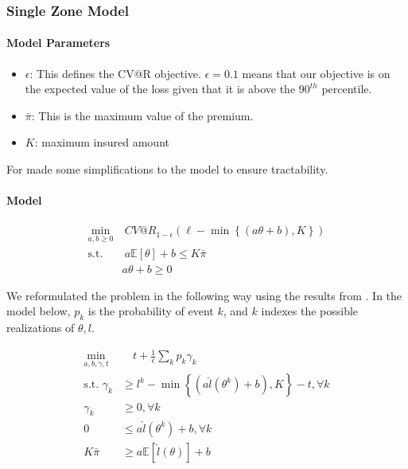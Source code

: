 \documentclass[11pt]{article}
\begin{document}
  \subsubsection*{Single Zone Model}
  \paragraph*{Model Parameters}
  \begin{itemize}
      \item $\epsilon$: This defines the CV@R objective. $\epsilon = 0.1$ means that our objective is on the expected value of the loss given that it is above the $90^{th}$ percentile. 
      \item $\bar{\pi}$: This is the maximum value of the premium. 
      \item $K$: maximum insured amount
  \end{itemize}

  For made some simplifications to the model to ensure tractability.
  
  \paragraph*{Model}
  \begin{align}
      \min_{a,b\geq 0} &\ CV@R_{1-\epsilon}\left(\ell  - \min\left\{(a\theta + b), K\right\} \right)\\
      \text{s.t.   } &\   a \mathbb{E} \left[\theta \right] + b \leq K\bar{\pi}\\
        & a\theta + b \geq 0 
  \end{align}
  
  We reformulated the problem in the following way using the results from \cite{rockafellar2000optimization}. In the model below, $p_k$ is the probability of event $k$, and $k$ indexes the possible realizations of $\theta, l$.
  
  \begin{align}
      \min_{a,b,\gamma,t} &\quad t + \frac{1}{\epsilon}\sum_k p_k \gamma_k\\
      \text{s.t.   } \gamma_k &\geq l^k - \min\left\{(a\hat{l}(\theta^k) + b), K\right\} - t, \forall k\\
      \gamma_k &\geq 0, \forall k \\
      0 &\leq a\hat{l}(\theta^k) + b, \forall k\\
      K\bar{\pi} &\geq a\mathbb{E}[\hat{l}(\theta)] + b
  \end{align}
    
\end{document}
